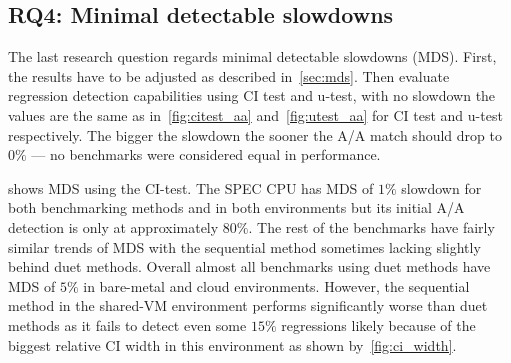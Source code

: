 \subsection{RQ4: Minimal detectable slowdowns}
\label{sec:rq4}

The last research question regards minimal detectable slowdowns (MDS).
First, the results have to be adjusted as described in~\cref{sec:mds}.
Then evaluate regression detection capabilities using CI test and \mbox{u-test}, with no slowdown the values are the same as in~\cref{fig:citest_aa} and~\cref{fig:utest_aa} for CI test and \mbox{u-test} respectively.
The bigger the slowdown the sooner the A/A match should drop to $0\%$ --- no benchmarks were considered equal in performance.

 shows MDS using the CI-test.
The SPEC CPU has MDS of $1\%$ slowdown for both benchmarking methods and in both environments but its initial A/A detection is only at approximately $80\%$.
The rest of the benchmarks have fairly similar trends of MDS with the sequential method sometimes lacking slightly behind duet methods.
Overall almost all benchmarks using duet methods have MDS of $5\%$ in bare-metal and cloud environments.
However, the sequential method in the \mbox{shared-VM} environment performs significantly worse than duet methods as it fails to detect even some $15\%$ regressions likely because of the biggest relative CI width in this environment as shown by~\cref{fig:ci_width}.

